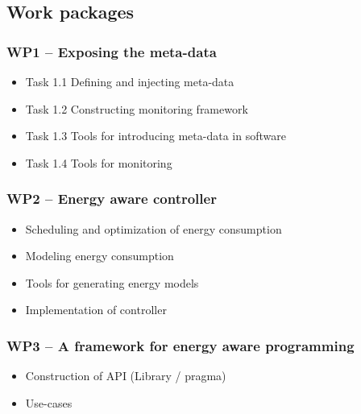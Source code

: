 \documentclass{article}
\begin{document}
\subsection{Work packages}
\subsubsection{WP1 -- Exposing the meta-data}
\begin{itemize}
 \item Task 1.1 Defining and injecting meta-data
 \item Task 1.2 Constructing monitoring framework
 \item Task 1.3 Tools for introducing meta-data in software
 \item Task 1.4 Tools for monitoring
\end{itemize}

\subsubsection{WP2 -- Energy aware controller}
\begin{itemize}
 \item Scheduling and optimization of energy consumption
 \item Modeling energy consumption
 \item Tools for generating energy models
 \item Implementation of controller
\end{itemize}

\subsubsection{WP3 -- A framework for energy aware programming}
\begin{itemize}
 \item Construction of API (Library / pragma)
 \item Use-cases
\end{itemize}
\end{document}
